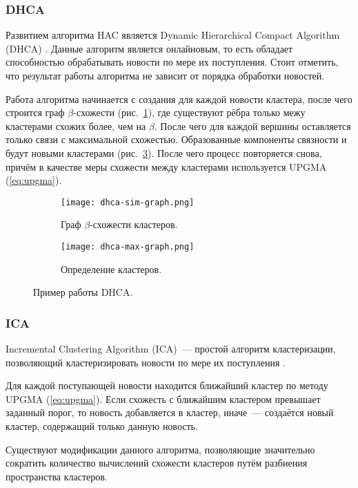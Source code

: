 \subsubsection{DHCA}
Развитием алгоритма HAC является Dynamic Hierarchical Compact Algorithm (DHCA) \cite{gil05}. Данные алгоритм является онлайновым, то есть обладает способностью обрабатывать новости по мере их поступления. Стоит отметить, что результат работы алгоритма не зависит от порядка обработки новостей.

Работа алгоритма начинается с создания для каждой новости кластера, после чего строится граф $\beta$-схожести (рис.~\ref{fig:beta-similarity}), где существуют рёбра только межу кластерами схожих более, чем на $\beta$. После чего для каждой вершины оставляется только связи с максимальной схожестью. Образованные компоненты связности и будут новыми кластерами (рис.~\ref{fig:max-similarity}). После чего процесс повторяется снова, причём в качестве меры схожести между кластерами используется UPGMA (\ref{eq:upgma}).

\begin{figure}
    \centering
    \begin{subfigure}{.5\textwidth}
        \centering
        \texttt{[image: dhca-sim-graph.png]}
        \caption{Граф $\beta$-схожести кластеров.}
        \label{fig:beta-similarity}
    \end{subfigure}%
    \begin{subfigure}{.5\textwidth}
        \centering
        \texttt{[image: dhca-max-graph.png]}
        \caption{Определение кластеров.}
        \label{fig:max-similarity}
    \end{subfigure}
    \caption{Пример работы DHCA.}
\end{figure}

\subsubsection{ICA}
Incremental Clustering Algorithm (ICA)~--- простой алгоритм кластеризации, позволяющий кластеризировать новости по мере их поступления \cite{lonnberg13}.

Для каждой поступающей новости находится ближайший кластер по методу UPGMA (\ref{eq:upgma}). Если схожесть с ближайшим кластером превышает заданный порог, то новость добавляется в кластер, иначе~--- создаётся новый кластер, содержащий только данную новость.

Существуют модификации данного алгоритма, позволяющие значительно сократить количество вычислений схожести кластеров \cite{lonnberg13} путём разбиения пространства кластеров.

